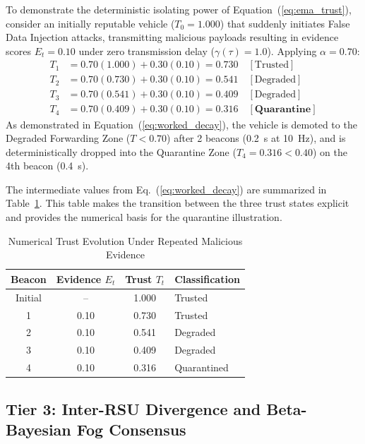 \documentclass[conference]{IEEEtran}
\begin{document}
To demonstrate the deterministic isolating power of Equation~(\ref{eq:ema_trust}), consider an initially reputable vehicle ($T_0 = 1.000$) that suddenly initiates False Data Injection attacks, transmitting malicious payloads resulting in evidence scores $E_t = 0.10$ under zero transmission delay ($\gamma(\tau) = 1.0$). Applying $\alpha = 0.70$:
\begin{align}
T_1 &= 0.70(1.000) + 0.30(0.10) = 0.730 \quad [\text{Trusted}] \nonumber \\
T_2 &= 0.70(0.730) + 0.30(0.10) = 0.541 \quad [\text{Degraded}] \nonumber \\
T_3 &= 0.70(0.541) + 0.30(0.10) = 0.409 \quad [\text{Degraded}] \nonumber \\
T_4 &= 0.70(0.409) + 0.30(0.10) = \mathbf{0.316} \quad [\mathbf{Quarantine}]
\label{eq:worked_decay}
\end{align}
As demonstrated in Equation~(\ref{eq:worked_decay}), the vehicle is demoted to the Degraded Forwarding Zone ($T < 0.70$) after 2 beacons (0.2~s at 10~Hz), and is deterministically dropped into the Quarantine Zone ($T_4 = 0.316 < 0.40$) on the 4th beacon (0.4~s).


The intermediate values from Eq.~(\ref{eq:worked_decay}) are summarized in Table~\ref{tab:trust_trajectory}. This table makes the transition between the three trust states explicit and provides the numerical basis for the quarantine illustration.
\begin{table}[htbp]
\centering
\caption{Numerical Trust Evolution Under Repeated Malicious Evidence}
\label{tab:trust_trajectory}
\begin{tabular}{cccl}
\toprule
\textbf{Beacon} & \textbf{Evidence $E_t$} & \textbf{Trust $T_t$} & \textbf{Classification} \\
\midrule
Initial & -- & 1.000 & Trusted \\
1 & 0.10 & 0.730 & Trusted \\
2 & 0.10 & 0.541 & Degraded \\
3 & 0.10 & 0.409 & Degraded \\
4 & 0.10 & 0.316 & Quarantined \\
\bottomrule
\end{tabular}
\end{table}

\subsection{Tier 3: Inter-RSU Divergence and Beta-Bayesian Fog Consensus}
\end{document}
